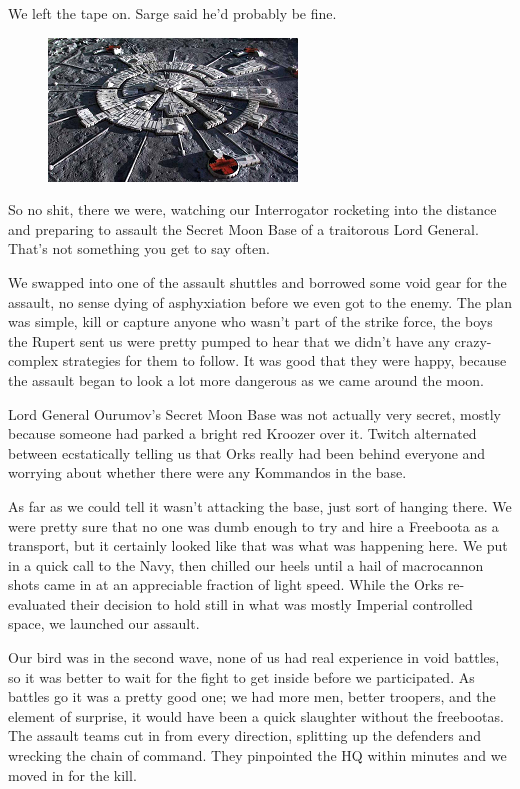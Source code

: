 We left the tape on. 
Sarge said he'd probably be fine.

\begin{figure}
	\begin{center}
		\includegraphics[width=\figwidth]{pics/9/51.png}
	\end{center}
\end{figure}
So no shit, there we were, watching our Interrogator rocketing into the distance and preparing to assault the Secret Moon Base of a traitorous Lord General. 
That's not something you get to say often.

We swapped into one of the assault shuttles and borrowed some void gear for the assault, no sense dying of asphyxiation before we even got to the enemy. 
The plan was simple, kill or capture anyone who wasn't part of the strike force, the boys the Rupert sent us were pretty pumped to hear that we didn't have any crazy-complex strategies for them to follow. 
It was good that they were happy, because the assault began to look a lot more dangerous as we came around the moon. 


Lord General Ourumov's Secret Moon Base was not actually very secret, mostly because someone had parked a bright red Kroozer over it. 
Twitch alternated between ecstatically telling us that Orks really had been behind everyone and worrying about whether there were any Kommandos in the base.

As far as we could tell it wasn't attacking the base, just sort of hanging there. 
We were pretty sure that no one was dumb enough to try and hire a Freeboota as a transport, but it certainly looked like that was what was happening here. 
We put in a quick call to the Navy, then chilled our heels until a hail of macrocannon shots came in at an appreciable fraction of light speed. 
While the Orks re-evaluated their decision to hold still in what was mostly Imperial controlled space, we launched our assault.

Our bird was in the second wave, none of us had real experience in void battles, so it was better to wait for the fight to get inside before we participated. 
As battles go it was a pretty good one; 
we had more men, better troopers, and the element of surprise, it would have been a quick slaughter without the freebootas. 
The assault teams cut in from every direction, splitting up the defenders and wrecking the chain of command. 
They pinpointed the HQ within minutes and we moved in for the kill.

